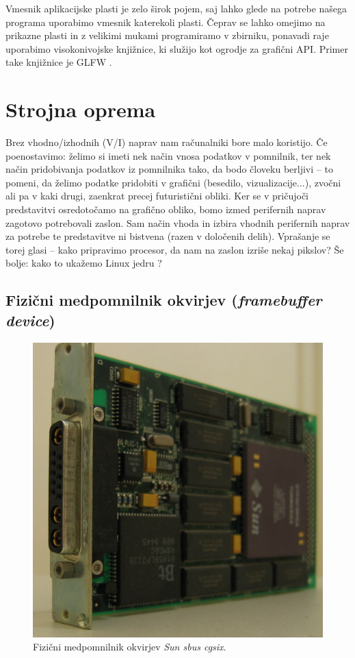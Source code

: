 \documentclass{article}
\begin{document}
Vmesnik aplikacijske plasti je zelo širok pojem, saj lahko glede na potrebe našega programa uporabimo vmesnik katerekoli plasti. Čeprav se lahko omejimo na prikazne plasti in z velikimi mukami programiramo v zbirniku, ponavadi raje uporabimo visokonivojske knjižnice, ki služijo kot ogrodje za grafični API. Primer take knjižnice je GLFW \autocite{glfw}.

\newpage

\section{Strojna oprema}
Brez vhodno/izhodnih (V/I) naprav nam računalniki bore malo koristijo. Če poenostavimo: želimo si imeti nek način vnosa podatkov v pomnilnik, ter nek način pridobivanja podatkov iz pomnilnika tako, da bodo človeku berljivi -- to pomeni, da želimo podatke pridobiti v grafični (besedilo, vizualizacije...), zvočni ali pa v kaki drugi, zaenkrat precej futuristični obliki. Ker se v pričujoči predstavitvi osredotočamo na grafično obliko, bomo izmed perifernih naprav zagotovo potrebovali zaslon. Sam način vhoda in izbira vhodnih perifernih naprav za potrebe te predstavitve ni bistvena (razen v določenih delih).
Vprašanje se torej glasi -- kako pripravimo procesor, da nam na zaslon izriše nekaj pikslov? Še bolje: kako to ukažemo Linux jedru \autocite{osdev}?

\subsection{Fizični medpomnilnik okvirjev (\textit{framebuffer device})}

\begin{figure}
    \vspace*{10pt}
    \centering
    \includegraphics[width=0.8\linewidth]{Sun_sbus_cgsix_framebuffer2}
    \caption{Fizični medpomnilnik okvirjev \textit{Sun sbus cgsix}. \autocite{fig:sunbus}}
\end{figure}
\
\end{document}
